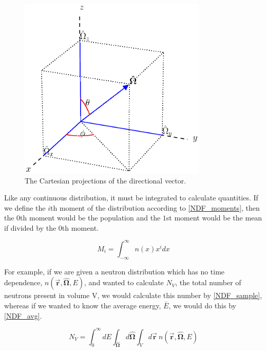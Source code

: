 \begin{figure}[h!] 
  \centering
    \includegraphics[width=0.8\textwidth , trim= 0cm 2.5cm 0cm 0cm]{graphics/ang_relation.eps} %
     \caption{The Cartesian projections of the directional vector. \label{ang_relations}}
\end{figure}

Like any continuous distribution, it must be integrated to calculate quantities.  If we define the $i$th moment of the distribution according to \eqref{NDF_moments}, then the $0$th moment would be the population and the $1$st moment would be the mean if divided by the $0$th moment.

\begin{equation}
\label{NDF_moments}
M_i = \int_{-\infty}^{\infty} n(x)  x^{i} dx
\end{equation}

For example, if we are given a neutron distribution which has no time dependence, $n(\boldsymbol{\vec{r}},\boldsymbol{\hat{\Omega}},E)$, and wanted to calculate $N_V$, the total number of neutrons present in volume V, we would calculate this number by \eqref{NDF_sample}, whereas if we wanted to know the average energy, $\bar{E}$, we would do this by \eqref{NDF_avg}.

\begin{equation}
\label{NDF_sample}
N_V = \int_0^\infty dE \int_{\boldsymbol{\hat{\Omega}}} d\boldsymbol{\hat{\Omega}}  \int_{V} d\boldsymbol{\vec{r}} \: n(\boldsymbol{\vec{r}},\boldsymbol{\hat{\Omega}},E)  
\end{equation}

